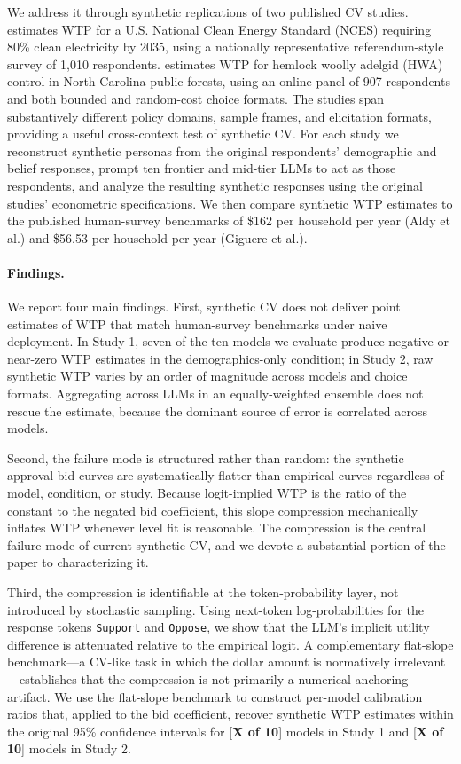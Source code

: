 \documentclass[12pt]{article}
\begin{document}
We address it through synthetic replications of two published CV studies. \textcite{Aldy2012} estimates WTP for a U.S. National Clean Energy Standard (NCES) requiring 80\% clean electricity by 2035, using a nationally representative referendum-style survey of 1{,}010 respondents. \textcite{Giguere2020} estimates WTP for hemlock woolly adelgid (HWA) control in North Carolina public forests, using an online panel of 907 respondents and both bounded and random-cost choice formats. The studies span substantively different policy domains, sample frames, and elicitation formats, providing a useful cross-context test of synthetic CV. For each study we reconstruct synthetic personas from the original respondents' demographic and belief responses, prompt ten frontier and mid-tier LLMs to act as those respondents, and analyze the resulting synthetic responses using the original studies' econometric specifications. We then compare synthetic WTP estimates to the published human-survey benchmarks of \$162 per household per year (Aldy et al.) and \$56.53 per household per year (Giguere et al.).

\paragraph{Findings.} We report four main findings. First, synthetic CV does not deliver point estimates of WTP that match human-survey benchmarks under naive deployment. In Study 1, seven of the ten models we evaluate produce negative or near-zero WTP estimates in the demographics-only condition; in Study 2, raw synthetic WTP varies by an order of magnitude across models and choice formats. Aggregating across LLMs in an equally-weighted ensemble does not rescue the estimate, because the dominant source of error is correlated across models.

Second, the failure mode is structured rather than random: the synthetic approval-bid curves are systematically flatter than empirical curves regardless of model, condition, or study. Because logit-implied WTP is the ratio of the constant to the negated bid coefficient, this slope compression mechanically inflates WTP whenever level fit is reasonable. The compression is the central failure mode of current synthetic CV, and we devote a substantial portion of the paper to characterizing it.

Third, the compression is identifiable at the token-probability layer, not introduced by stochastic sampling. Using next-token log-probabilities for the response tokens \texttt{Support} and \texttt{Oppose}, we show that the LLM's implicit utility difference is attenuated relative to the empirical logit. A complementary flat-slope benchmark---a CV-like task in which the dollar amount is normatively irrelevant---establishes that the compression is not primarily a numerical-anchoring artifact. We use the flat-slope benchmark to construct per-model calibration ratios that, applied to the bid coefficient, recover synthetic WTP estimates within the original 95\% confidence intervals for [\textbf{X of 10}] models in Study 1 and [\textbf{X of 10}] models in Study 2.
\end{document}
